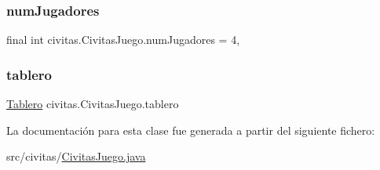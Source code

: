\subsubsection{\texorpdfstring{num\+Jugadores}{numJugadores}}
{\footnotesize\ttfamily final int civitas.\+Civitas\+Juego.\+num\+Jugadores = 4\hspace{0.3cm}{\ttfamily [static]}, {\ttfamily [package]}}

\mbox{\label{classcivitas_1_1CivitasJuego_a826db446a6b18c2d6b5dc12a97aeed5f}} 
\subsubsection{\texorpdfstring{tablero}{tablero}}
{\footnotesize\ttfamily \hyperlink{classcivitas_1_1Tablero}{Tablero} civitas.\+Civitas\+Juego.\+tablero\hspace{0.3cm}{\ttfamily [private]}}



La documentación para esta clase fue generada a partir del siguiente fichero\+:\begin{DoxyCompactItemize}
\item 
src/civitas/\hyperlink{CivitasJuego_8java}{Civitas\+Juego.\+java}\end{DoxyCompactItemize}
